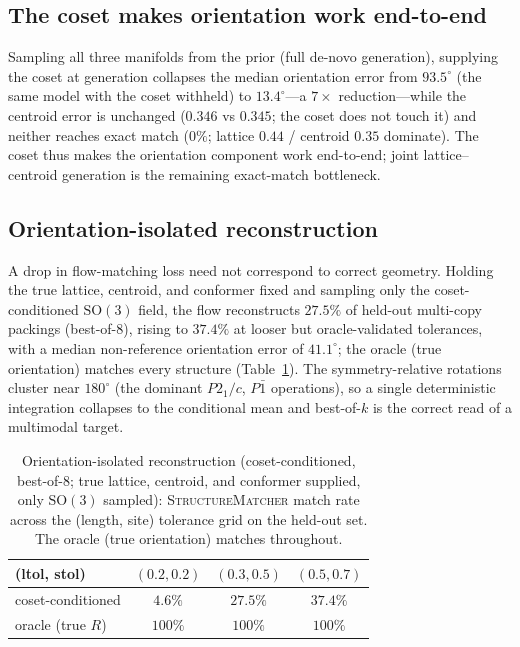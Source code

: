 \documentclass[journal=acsodf,manuscript=article]{achemso}
\begin{document}
\subsection{The coset makes orientation work end-to-end}\label{sec:e2e}
Sampling all three manifolds from the prior (full de-novo generation), supplying
the coset at generation collapses the median orientation error from $93.5^\circ$
(the same model with the coset withheld) to $13.4^\circ$---a $7\times$
reduction---while the centroid error is unchanged ($0.346$ vs $0.345$; the coset
does not touch it) and neither reaches exact match ($0\%$; lattice $0.44$ /
centroid $0.35$ dominate). The coset thus makes the orientation component work
end-to-end; joint lattice--centroid generation is the remaining exact-match
bottleneck.

\subsection{Orientation-isolated reconstruction}\label{sec:orientiso}
A drop in flow-matching loss need not correspond to correct geometry. Holding the
true lattice, centroid, and conformer fixed and sampling only the coset-conditioned
$\mathrm{SO}(3)$ field, the flow reconstructs $27.5\%$ of held-out multi-copy
packings (best-of-$8$), rising to $37.4\%$ at looser but oracle-validated
tolerances, with a median non-reference orientation error of $41.1^\circ$; the
oracle (true orientation) matches every structure (Table~\ref{tab:tolsweep}). The
symmetry-relative rotations cluster near $180^\circ$ (the dominant $P2_1/c$,
$P\bar1$ operations)\cite{groom2016csd}, so a single deterministic integration
collapses to the conditional mean and best-of-$k$ is the correct read of a
multimodal target.

\begin{table}[t]\centering
\caption{Orientation-isolated reconstruction (coset-conditioned, best-of-$8$; true
lattice, centroid, and conformer supplied, only $\mathrm{SO}(3)$ sampled):
\textsc{StructureMatcher} match rate across the (length, site) tolerance grid on
the held-out set. The oracle (true orientation) matches throughout.}
\label{tab:tolsweep}
\begin{tabular}{lccc}\toprule
(ltol, stol) & $(0.2,0.2)$ & $(0.3,0.5)$ & $(0.5,0.7)$ \\\midrule
coset-conditioned & $4.6\%$  & $27.5\%$ & $37.4\%$ \\
oracle (true $R$) & $100\%$  & $100\%$  & $100\%$  \\\bottomrule
\end{tabular}
\end{table}
\end{document}
